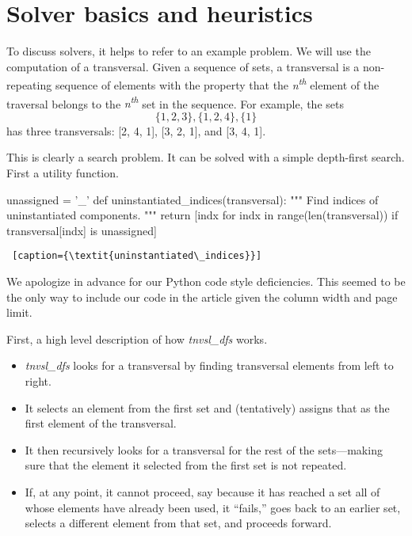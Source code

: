 \section{Solver basics and heuristics} \label{sec:solver-basics}

To discuss solvers, it helps to refer to an example problem. We will use the computation of a transversal. Given a sequence of sets, a transversal is a non-repeating sequence of elements with the property that the \textit{n\textsuperscript{th}} element of the traversal belongs to the \textit{n\textsuperscript{th}} set in the sequence.  For example, the sets \[\{1, 2, 3\}, \{1, 2, 4\}, \{1\}\] has three transversals: [2, 4, 1], [3, 2, 1], and [3, 4, 1]. 

This is clearly a search problem. It can be solved with a simple depth-first search. First a utility function.

\begin{minipage}[c]{0.45\textwidth}
\begin{python1}  
unassigned = '_'
def uninstantiated_indices(transversal):
  """ Find indices of uninstantiated components. """
  return [indx for indx in range(len(transversal)) 
               if transversal[indx] is unassigned]
\end{python1}\linv
\begin{lstlisting} [caption={\textit{uninstantiated\_indices}}]
\end{lstlisting}
\end{minipage}

We apologize in advance for our Python code style deficiencies. This seemed to be the only way to include our code in the article given the column width and page limit.

First, a high level description of how \textit{tnvsl\_dfs} works. 
\begin{itemize}
    \item \textit{tnvsl\_dfs} looks for a transversal by finding transversal elements from left to right.
    \item It selects an element from the first set and (tentatively) assigns that as the first element of the transversal.
    \item It then recursively looks for a transversal for the rest of the sets---making sure that the element it selected from the first set is not repeated.
    \item If, at any point, it cannot proceed, say because it has reached a set all of whose elements have already been used, it ``fails,'' goes back to an earlier set, selects a different element from that set, and proceeds forward.
\end{itemize}

